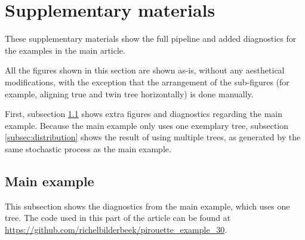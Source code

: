 \section{Supplementary materials}

These supplementary materials show the full pipeline and
added diagnostics for the examples in the main article.

All the figures shown in this section are shown as-is, 
without any aesthetical modifications, with the exception that the arrangement
of the sub-figures (for example, aligning true and twin tree
horizontally) is done manually.

First, subsection \ref{subsec:main_example} shows extra figures and
 diagnostics regarding the main example. Because the main example
only uses one exemplary tree, subsection \ref{subsec:distribution}
shows the result of using multiple trees, as generated by the
same stochastic process as the main example.

\subsection{Main example}
\label{subsec:main_example}


This subsection shows the diagnostics from the main example, which
uses one tree.
The code used in this part of the article can be found at 
\url{https://github.com/richelbilderbeek/pirouette_example_30}.

